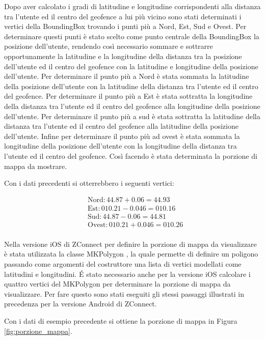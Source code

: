 Dopo aver calcolato i gradi di latitudine e longitudine corrispondenti alla distanza tra l'utente ed il centro del geofence a lui più vicino sono stati determinati i vertici della BoundingBox trovando i punti più a Nord, Est, Sud e Ovest.
Per determinare questi punti è stato scelto come punto centrale della BoundingBox la posizione dell'utente, rendendo così necessario sommare e sottrarre opportunamente la latitudine e la longitudine della distanza tra la posizione dell'utente ed il centro del geofence con la latitudine e longitudine della posizione dell'utente.
Per determinare il punto più a Nord è stata sommata la latitudine della posizione dell'utente con la latitudine della distanza tra l'utente ed il centro del geofence. Per determinare il punto più a Est è stata sottratta la longitudine della distanza tra l'utente ed il centro del geofence alla longitudine della posizione dell'utente. Per determinare il punto più a sud è stata sottratta la latitudine della distanza tra l'utente ed il centro del geofence alla latitudine della posizione dell'utente. Infine per determinare il punto più ad ovest è stata sommata la longitudine della posizione dell'utente con la longitudine della distanza tra l'utente ed il centro del geofence.
Così facendo è stata determinata la porzione di mappa da mostrare.

Con i dati precedenti si otterrebbero i seguenti vertici:

\[\begin{split}
    &\text{Nord}: 44.87 + 0.06 = 44.93 \\
    &\text{Est}: 010.21 - 0.046 = 010.16 \\
    &\text{Sud}: 44.87 - 0.06 = 44.81 \\
    &\text{Ovest}: 010.21 + 0.046 = 010.26 \\
\end{split}\]

Nella versione iOS di ZConnect per definire la porzione di mappa da visualizzare è stata utilizzata la classe MKPolygon \cite{MKPolygon}, la quale permette di definire un poligono passando come argomenti del costruttore una lista di vertici modellati come latitudini e longitudini. \' E stato necessario anche per la versione iOS calcolare i quattro vertici del MKPolygon per determinare la porzione di mappa da visualizzare. Per fare questo sono stati eseguiti gli stessi passaggi illustrati in precedenza per la versione Android di ZConnect.

Con i dati di esempio precedente si ottiene la porzione di mappa in Figura \ref{fig:porzione_mappa}.

